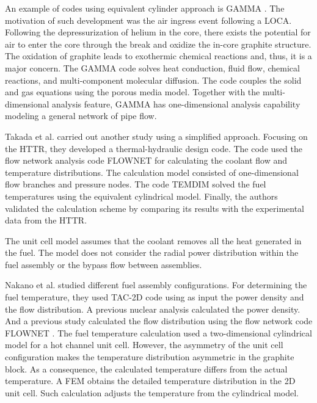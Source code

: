 \documentclass[11pt,letterpaper]{article}
\begin{document}
An example of codes using equivalent cylinder approach is GAMMA \cite{no_multi-component_2007}.
The motivation of such development was the air ingress event following a LOCA.
Following the depressurization of helium in the core, there exists the potential for air to enter the core through the break and oxidize the in-core graphite structure.
The oxidation of graphite leads to exothermic chemical reactions and, thus, it is a major concern.
The GAMMA code solves heat conduction, fluid flow, chemical reactions, and multi-component molecular diffusion.
The code couples the solid and gas equations using the porous media model.
Together with the multi-dimensional analysis feature, GAMMA has one-dimensional analysis capability modeling a general network of pipe flow.

Takada et al. \cite{takada_core_2004} carried out another study using a simplified approach.
Focusing on the \gls{HTTR}, they developed a thermal-hydraulic design code.
The code used the flow network analysis code FLOWNET for calculating the coolant flow and temperature distributions.
The calculation model consisted of one-dimensional flow branches and pressure nodes.
The code TEMDIM solved the fuel temperatures using the equivalent cylindrical model.
Finally, the authors validated the calculation scheme by comparing its results with the experimental data from the \gls{HTTR}.

The unit cell model assumes that the coolant removes all the heat generated in the fuel.
The model does not consider the radial power distribution within the fuel assembly or the bypass flow between assemblies.

Nakano et al. \cite{nakano_conceptual_2008} studied different fuel assembly configurations.
For determining the fuel temperature, they used TAC-2D code \cite{peterson_tac2d_1969} using as input the power density and the flow distribution.
A previous nuclear analysis calculated the power density.
And a previous study calculated the flow distribution using the flow network code FLOWNET \cite{maruyama_verification_1988}.
The fuel temperature calculation used a two-dimensional cylindrical model for a hot channel unit cell.
However, the asymmetry of the unit cell configuration makes the temperature distribution asymmetric in the graphite block.
As a consequence, the calculated temperature differs from the actual temperature.
A \gls{FEM} obtains the detailed temperature distribution in the 2D unit cell.
Such calculation adjusts the temperature from the cylindrical model.
\end{document}
